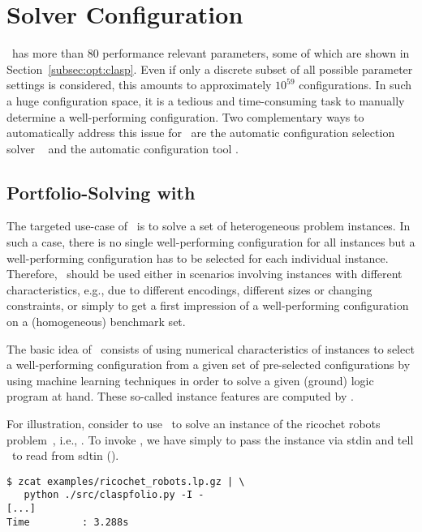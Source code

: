 
\section{Solver Configuration}
\label{sec:configuration}

\clasp\ has more than $80$ performance relevant parameters, some of which are shown in Section~\ref{subsec:opt:clasp}.
Even if only a discrete subset of all possible parameter settings is considered,
this amounts to approximately $10^{59}$ configurations.
In such a huge configuration space, 
it is a tedious and time-consuming task 
to manually determine a well-performing configuration.
Two complementary ways to automatically address this issue for \clasp\ are 
the automatic configuration selection solver \claspfolio~\cite{holisc14a} and 
the automatic configuration tool \piclasp.%

\subsection{Portfolio-Solving with \claspfolio}
\label{sec:claspfolio}

The targeted use-case of \claspfolio\ is to solve a set of heterogeneous problem instances.
In such a case,
there is no single well-performing configuration for all instances
but a well-performing configuration has to be selected for each individual instance.
Therefore, \claspfolio\ should be used either 
in scenarios involving instances with different characteristics, 
e.g., due to different encodings, different sizes or changing constraints,
or 
simply to get a first impression of a well-performing configuration on a (homogeneous) benchmark set. 

The basic idea of \claspfolio\ consists of using numerical characteristics of instances
to select a well-performing configuration from a given set of pre-selected configurations
by using machine learning techniques
in order to solve a given (ground) logic program at hand.
These so-called instance features are computed by \claspre. %

For illustration,
consider to use \claspfolio\ to solve an instance of the ricochet robots problem~\cite{gejokaobsascsc13a},
i.e., .
To invoke \claspfolio, we have simply to pass the instance via stdin 
and tell \claspfolio\ to read from sdtin ().
\begin{lstlisting}[numbers=none]
$ zcat examples/ricochet_robots.lp.gz | \
   python ./src/claspfolio.py -I -
[...]
Time         : 3.288s
\end{lstlisting}


